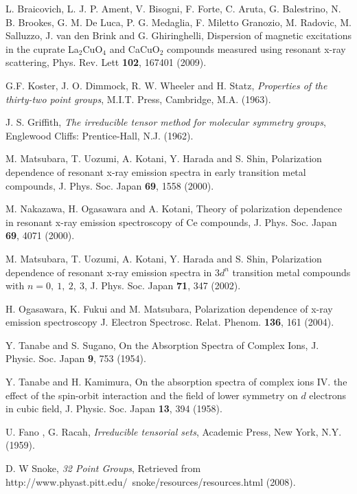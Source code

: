 \documentclass[twocolumn,prb,twocolumn,amsmath,superscriptaddress,nofootinbib,amssymb]{revtex4-1}
\begin{document}
\begin{thebibliography}{63}
L. Braicovich, L. J. P. Ament, V. Bisogni, F. Forte, C. Aruta, G. Balestrino, N. B. Brookes, G. M. De Luca, P. G. Medaglia, F. Miletto Granozio, M. Radovic, M. Salluzzo, J. van den Brink and G. Ghiringhelli,
Dispersion of magnetic excitations in the cuprate La$_2$CuO$_4$ and CaCuO$_2$ compounds measured using resonant x-ray scattering,
Phys. Rev. Lett {\bf102}, 167401 (2009).

G.F. Koster, J. O. Dimmock, R. W. Wheeler and H. Statz,
\textit{Properties of the thirty-two point groups},
M.I.T. Press, Cambridge, M.A. (1963).

J. S. Griffith,
\textit{The irreducible tensor method for molecular symmetry groups},
Englewood Cliffs: Prentice-Hall, N.J. (1962).

M. Matsubara, T. Uozumi, A. Kotani, Y. Harada and S. Shin,
Polarization dependence of resonant x-ray emission spectra in early transition metal compounds,
J. Phys. Soc. Japan {\bf 69}, 1558 (2000).

M. Nakazawa, H. Ogasawara and A. Kotani,
Theory of polarization dependence in resonant x-ray emission spectroscopy of Ce compounds,
J. Phys. Soc. Japan {\bf69}, 4071 (2000).

M. Matsubara, T. Uozumi, A. Kotani, Y. Harada and S. Shin,
Polarization dependence of resonant x-ray emission spectra in $3d^n$ transition metal compounds with $n=0,~1,~2,~3$,
J. Phys. Soc. Japan {\bf71}, 347 (2002).

H. Ogasawara, K. Fukui and M. Matsubara,
Polarization dependence of x-ray emission spectroscopy
J. Electron Spectrosc. Relat. Phenom. {\bf136}, 161 (2004).

Y. Tanabe and S. Sugano,
On the Absorption Spectra of Complex Ions,
J. Physic. Soc. Japan {\bf9}, 753 (1954).

 Y. Tanabe and H. Kamimura,
On the absorption spectra of complex ions IV. the effect of the spin-orbit interaction and the field of lower symmetry on $d$ electrons in cubic field,
J. Physic. Soc. Japan {\bf13}, 394 (1958).

U. Fano , G. Racah,
\textit{Irreducible tensorial sets},
Academic Press, New York, N.Y. (1959).

D. W Snoke,
\textit{32 Point Groups},
Retrieved from http://www.phyast.pitt.edu/~snoke/resources/resources.html (2008).


\end{thebibliography}
\end{document}
